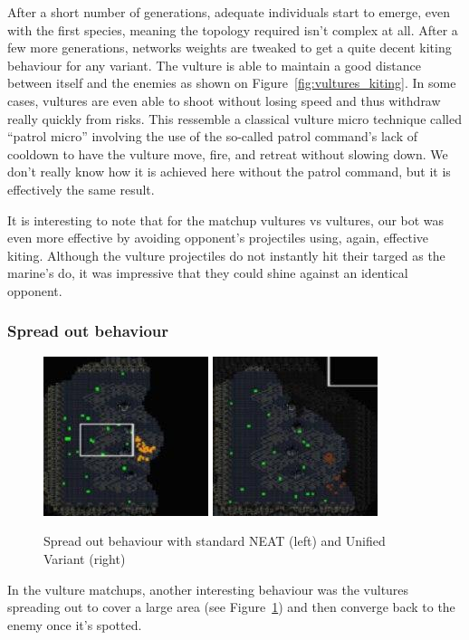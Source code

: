 After a short number of generations, adequate individuals start to
emerge, even with the first species, meaning the topology required
isn’t complex at all. After a few more generations, networks weights
are tweaked to get a quite decent kiting behaviour for any variant.
The vulture is able to maintain a good distance between itself and the
enemies as shown on Figure~\ref{fig:vultures_kiting}. In some cases,
vultures are even able to shoot without losing speed and thus withdraw
really quickly from risks. This ressemble a classical vulture micro
technique called “patrol micro” involving the use of the so-called
patrol command's lack of cooldown to have the vulture move, fire, and
retreat without slowing down. We don’t really know how it is achieved
here without the patrol command, but it is effectively the same
result.

It is interesting to note that for the matchup vultures vs vultures,
our bot was even more effective by avoiding opponent's projectiles
using, again, effective kiting. Although the vulture projectiles do
not instantly hit their targed as the marine's do, it was impressive
that they could shine against an identical opponent.

\subsubsection{Spread out behaviour}\label{subsec:spreading}

\begin{figure}
    \includegraphics[width=.22\textwidth]{figures/spreading_behaviour_standard_neat}
    \includegraphics[width=.22\textwidth]{figures/spreading_behaviour_unified}
    \caption{Spread out behaviour with standard NEAT (left) and Unified Variant (right)}\label{fig:spreading-behaviour}
\end{figure}

In the vulture matchups, another interesting behaviour was the
vultures spreading out to cover a large area (see
Figure~\ref{fig:spreading-behaviour}) and then converge back to the
enemy once it's spotted.


